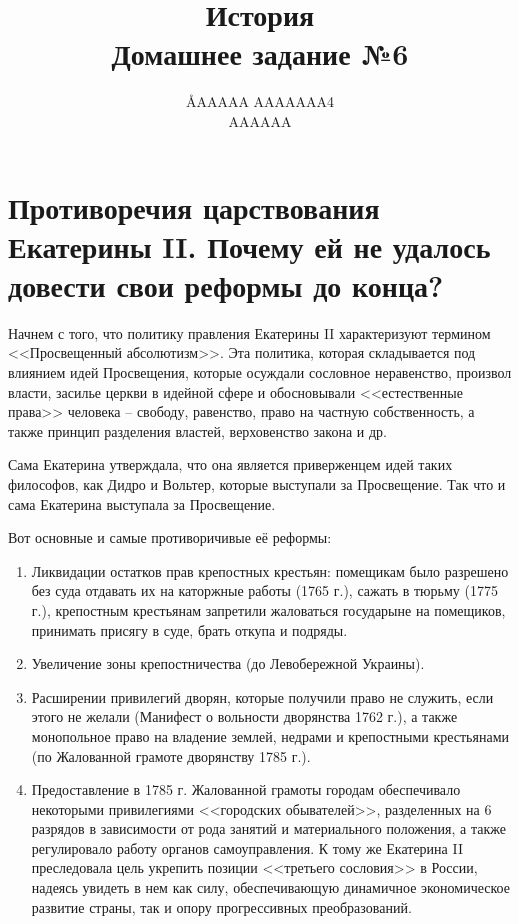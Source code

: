 \documentclass[12pt]{article}
\title{История \\ Домашнее задание №6}
\author{\AA{AAAAA AAAAAAA}{4} \\ AAAAAA}
\begin{document}
  \maketitle

  \section{Противоречия царствования Екатерины II. Почему ей не удалось довести свои реформы до конца?}
  Начнем с того, что политику правления Екатерины II характеризуют термином <<Просвещенный абсолютизм>>.
  Эта политика, которая складывается под влиянием идей Просвещения,
  которые осуждали сословное неравенство, произвол власти,
  засилье церкви в идейной сфере и обосновывали <<естественные права>> человека -- свободу,
  равенство, право на частную собственность, а также принцип разделения властей, верховенство закона и др.

  Сама Екатерина утверждала, что она является приверженцем идей таких философов, как Дидро и Вольтер, которые выступали за Просвещение.
  Так что и сама Екатерина выступала за Просвещение.

  Вот основные и самые противоричивые её реформы:
  \begin{enumerate}
    \item
    Ликвидации остатков прав крепостных крестьян:
    помещикам было разрешено без суда отдавать их на каторжные работы (1765 г.), сажать в тюрьму (1775 г.),
    крепостным крестьянам запретили жаловаться государыне на помещиков, принимать присягу в суде, брать откупа и подряды.

    \item
    Увеличение зоны крепостничества (до Левобережной Украины).

    \item
    Расширении привилегий дворян, которые получили право не служить, если этого не желали (Манифест о вольности дворянства 1762 г.),
    а также монопольное право на владение землей, недрами и крепостными крестьянами (по Жалованной грамоте дворянству 1785 г.).

    \item
    Предоставление в 1785 г. Жалованной грамоты городам обеспечивало некоторыми привилегиями <<городских обывателей>>,
    разделенных на 6 разрядов в зависимости от рода занятий и материального положения, а также регулировало работу органов самоуправления.
    К тому же Екатерина II преследовала цель укрепить позиции <<третьего сословия>> в России,
    надеясь увидеть в нем как силу, обеспечивающую динамичное экономическое развитие страны, так и опору прогрессивных преобразований.
  \end{enumerate}
\end{document}
